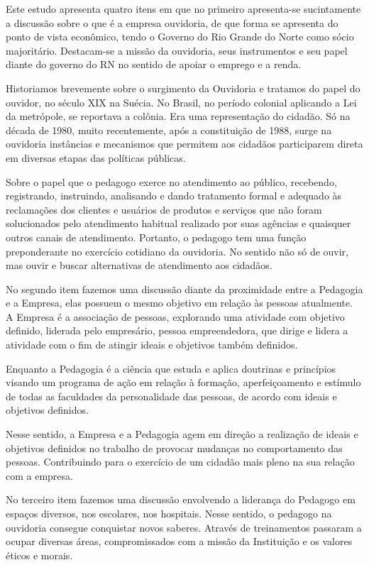 \begin{refsection}
    Este estudo apresenta quatro itens em que no primeiro apresenta-se sucintamente a discussão sobre o que é a empresa ouvidoria, de que forma se apresenta do ponto de vista econômico, tendo o Governo do Rio Grande do Norte como sócio majoritário. Destacam-se a missão da ouvidoria, seus instrumentos e seu papel diante do governo do RN no sentido de apoiar o emprego e a renda.     

    Historiamos brevemente sobre o surgimento da Ouvidoria e tratamos do papel do ouvidor, no século XIX na Suécia. No Brasil, no período colonial aplicando a Lei da metrópole, se reportava a colônia. Era uma representação do cidadão. Só na década de 1980, muito recentemente, após a constituição de 1988, surge na ouvidoria instâncias e mecanismos que permitem aos cidadãos participarem direta em diversas etapas das políticas públicas.       

    Sobre o papel que o pedagogo exerce no atendimento ao público, recebendo, registrando, instruindo, analisando e dando tratamento formal e adequado às reclamações dos clientes e usuários de produtos e serviços que não foram solucionados pelo atendimento habitual realizado por suas agências e quaisquer outros canais de atendimento. Portanto, o pedagogo tem uma função preponderante no exercício cotidiano da ouvidoria. No sentido não só de ouvir, mas ouvir e buscar alternativas de atendimento aos cidadãos.  

    No segundo item fazemos uma discussão diante da proximidade entre a Pedagogia e a Empresa, elas possuem o mesmo objetivo em relação às pessoas atualmente. A Empresa é a associação de pessoas, explorando uma atividade com objetivo definido, liderada pelo empresário, pessoa empreendedora, que dirige e lidera a atividade com o fim de atingir ideais e objetivos também definidos. 

    Enquanto a Pedagogia é a ciência que estuda e aplica doutrinas e princípios visando um programa de ação em relação à formação, aperfeiçoamento e estímulo de todas as faculdades da personalidade das pessoas, de acordo com ideais e objetivos definidos.  

    Nesse sentido, a Empresa e a Pedagogia agem em direção a realização de ideais e objetivos definidos no trabalho de provocar mudanças no comportamento das pessoas. Contribuindo para o exercício de um cidadão mais pleno na sua relação com a empresa.   

    No terceiro item fazemos uma discussão envolvendo a liderança do Pedagogo em espaços diversos, nos escolares, nos hospitais. Nesse sentido, o pedagogo na ouvidoria consegue conquistar novos saberes. Através de treinamentos passaram a ocupar diversas áreas, compromissados com a missão da Instituição e os valores éticos e morais.    


\end{refsection}
